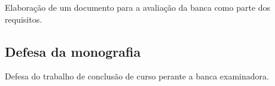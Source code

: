 Elabora\c{c}\~ao de um documento para a avalia\c{c}\~ao da banca como parte dos requisitos.

\subsection{Defesa da monografia}

Defesa do trabalho de conclus\~ao de curso perante a banca examinadora.

